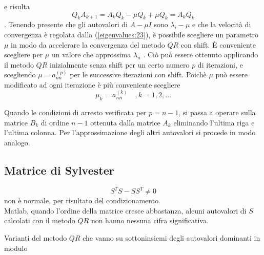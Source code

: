 e risulta
$$Q_k A_{k+1} = A_k Q_k − \mu Q_k + \mu Q_k = A_k Q_k $$.
Tenendo presente che gli autovalori di $A − \mu I$ sono $\lambda_i − \mu$ e che
 la velocit\`a
di convergenza \`e regolata dalla (\ref{eigenvalues:23}), \`e
 possibile scegliere un parametro $\mu$
in modo da accelerare la convergenza del metodo $QR$ con shift. \`E conveniente
scegliere per $\mu$ un valore che approssima $\lambda_n$ . Ci\`o pu\`o essere ottenuto
applicando il metodo $QR$ inizialmente senza shift per un certo numero $p$ di
iterazioni, e scegliendo $\mu = a_{nn}^{(p)}$ per le successive iterazioni con shift.
Poich\`e $\mu$ pu\`o essere modificato ad ogni iterazione \`e pi\`u conveniente
scegliere
\begin{equation}
\label{eigenvalues:24}
\mu_k = a_{nn}^{(k)} \quad, k = 1, 2, \ldots
\end{equation}

Quando le condizioni di arresto verificata per $p = n−1$, si passa a operare sulla matrice
$B_k$ di ordine $n - 1$ ottenuta dalla matrice $A_k$ eliminando l'ultima riga e
l'ultima colonna. Per l'approssimazione degli altri autovalori si procede in
modo analogo.

\subsection{Matrice di Sylvester}
\begin{workinprogress}
 $$ S^{T}S - SS^{T} \neq 0$$
 non \`e normale, per risultato del condizionamento. \\
Matlab, quando l'ordine della matrice cresce abbastanza,
alcuni autovalori di $S$ calcolati con il metodo $QR$
non hanno nessuna cifra significativa.

Varianti del metodo $QR$ che vanno su sottoninsiemi
degli autovalori dominanti in modulo
\end{workinprogress}

